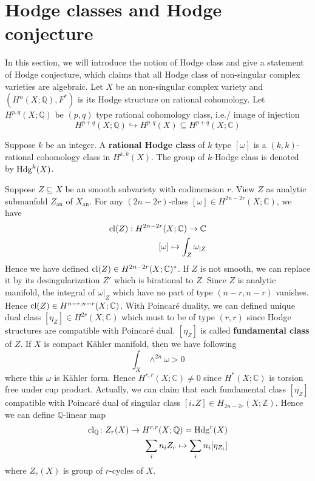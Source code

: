 \documentclass{amsart}
\begin{document}
\section{Hodge classes and Hodge conjecture}
In this section, we will introduce the notion of Hodge class and give a statement of Hodge conjecture, which claims that all Hodge class of non-singular complex varieties are algebraic. Let $X$ be an non-singular complex variety and $(H^n(X;\mathbb{Q}),F^*)$ is its Hodge structure on rational cohomology. Let $H^{p,q}(X;\mathbb{Q})$ be $(p,q)$ type rational cohomology class, i.e./ image of injection
\begin{equation}
	H^{p+q}(X;\mathbb{Q}) \hookrightarrow H^{p,q}(X) \subseteq H^{p+q}(X;\mathbb{C})
\end{equation}
\begin{secdefn}
	Suppose $k$ be an integer. A \textbf{rational Hodge class} of $k$ type $[\omega]$ is a $(k,k)$-rational cohomology class in $H^{k,k}(X)$. The group of $k$-Hodge class is denoted by $\operatorname{Hdg}^k(X)$.
\end{secdefn}
Suppose $Z \subseteq X$ be an smooth subvariety with codimension $r$. View $Z$ as analytic submanfold $Z_\text{an}$ of $X_\text{an}$. For any $(2n-2r)$-class $[\omega] \in H^{2n-2r}(X;\mathbb{C})$, we have
\begin{align*}
\operatorname{cl}(Z):H^{2n-2r}(X;\mathbb{C}) \rightarrow \mathbb{C}\\
[\omega] \mapsto \int_{Z} \omega_{|Z}
\end{align*}
Hence we have defined $\operatorname{cl}(Z) \in H^{2n-2r}(X;\mathbb{C})^*$. If $Z$ is not smooth, we can replace it by its desingularization $Z'$ which is birational to $Z$. Since $Z$ is analytic manifold, the integral of $\omega|_Z$ which have no part of type $(n-r,n-r)$ vanishes. Hence $\operatorname{cl}(Z) \in H^{n-r,n-r}(X; \mathbb{C})$.
With Poincar\'e duality, we can defined unique dual class $[\eta_Z] \in H^{2r}(X;\mathbb{C})$ which must to be of type $(r,r)$ since Hodge structures are compatible with Poincar\'e dual. $[\eta_Z]$ is called \textbf{fundamental class} of $Z$.
If $X$ is compact K\"ahler manifold, then we have following 
\begin{equation}
	\int_{X} \wedge^{2n}\omega >0 
\end{equation}
where this $\omega$ is K\"ahler form. Hence $H^{r,r}(X;\mathbb{C}) \neq 0$ since $H^*(X;\mathbb{C})$ is torsion free under cup product.
Actually, we can claim that each fundamental class $[\eta_Z]$ compatible with Poincar\'e dual of singular class $[i_*Z] \in H_{2n-2r}(X;\mathbb{Z})$. Hence we can define $\mathbb{Q}$-linear map
\begin{align*}
	\operatorname{cl_\mathbb{Q}} \colon Z_r(X) \to H^{r,r}(X;\mathbb{Q})=\operatorname{Hdg}^r(X)\\
	\sum_i n_i Z_r \mapsto \sum_i n_i [\eta_{Z_i}]	
\end{align*}
where $Z_r(X)$ is group of $r$-cycles of $X$.
\end{document}
